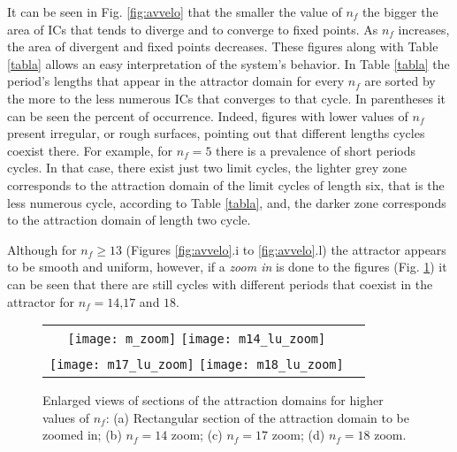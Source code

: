It can be seen in Fig. \ref{fig:avvelo} that the smaller the value of $n_f$ the bigger the area of ICs that tends to diverge and to converge to fixed points. As $n_f$ increases, the area of divergent and fixed points decreases.
These figures along with Table \ref{tabla} allows an easy interpretation of the system's behavior. In Table \ref{tabla} the period's lengths that appear in the attractor domain for every $n_f$ are sorted by the more to the less numerous ICs that converges to that cycle. In parentheses it can be seen the percent of occurrence.
Indeed, figures with lower values of $n_f$ present irregular, or rough surfaces, pointing out that different lengths cycles coexist there. For example, for $n_f=5$ there is a prevalence of  short periods cycles. In that case, there exist just two limit cycles, the lighter grey zone corresponds to the attraction domain of the limit cycles of length six, that is the less numerous cycle, according to Table \ref{tabla}, and, the darker zone corresponds to the attraction domain of length two cycle.

Although for $n_f \geqslant 13$ (Figures \ref{fig:avvelo}.i to \ref{fig:avvelo}.l) the attractor appears to be smooth and uniform, however, if a \emph{zoom in} is done to the figures (Fig. \ref{fig:m_zoom}) it can be seen that there are still  cycles with different periods that coexist in the attractor for $n_f=14$,$17$ and $18$.


\begin{figure}
\begin{tabular}{cc}
\texttt{[image: m\_zoom]}
\texttt{[image: m14\_lu\_zoom]}\\
\texttt{[image: m17\_lu\_zoom]}
\texttt{[image: m18\_lu\_zoom]}
\end{tabular}
\caption{Enlarged views of sections of the attraction domains for higher values of $n_f$:
(a) Rectangular section of the attraction domain to be zoomed in; (b)  $n_f=14$ zoom; (c) $n_f=17$ zoom;  (d) $n_f=18$ zoom.}
\label{fig:m_zoom}
\end{figure}

